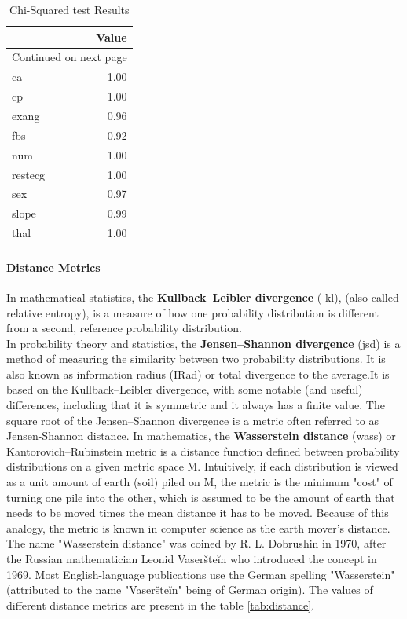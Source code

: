 \documentclass{article}
\begin{document}
\begin{longtable}{lr}
\caption{Chi-Squared test Results}\label{tab:cs}\\
\toprule
{} & Value \\
\midrule
\endhead
\midrule
\multicolumn{2}{r}{{Continued on next page}} \\
\midrule
\endfoot

\bottomrule
\endlastfoot
ca      &  1.00 \\
cp      &  1.00 \\
exang   &  0.96 \\
fbs     &  0.92 \\
num     &  1.00 \\
restecg &  1.00 \\
sex     &  0.97 \\
slope   &  0.99 \\
thal    &  1.00 \\
\end{longtable}



\paragraph{Distance Metrics}
In mathematical statistics, the \textbf{Kullback–Leibler divergence} ( \acrshort{kl}),  (also called relative entropy), is a measure of how one probability distribution is different from a second, reference probability distribution.\\
In probability theory and statistics, the \textbf{Jensen–Shannon divergence} (\acrshort{jsd}) is a method of measuring the similarity between two probability distributions. It is also known as information radius (IRad) or total divergence to the average.It is based on the Kullback–Leibler divergence, with some notable (and useful) differences, including that it is symmetric and it always has a finite value. The square root of the Jensen–Shannon divergence is a metric often referred to as Jensen-Shannon distance.     
In mathematics, the \textbf{Wasserstein distance} (\acrshort{wass}) or Kantorovich–Rubinstein metric is a distance function defined between probability distributions on a given metric space M.
Intuitively, if each distribution is viewed as a unit amount of earth (soil) piled on M, the metric is the minimum "cost" of turning one pile into the other, which is assumed to be the amount of earth that needs to be moved times the mean distance it has to be moved. Because of this analogy, the metric is known in computer science as the earth mover's distance.
The name "Wasserstein distance" was coined by R. L. Dobrushin in 1970, after the Russian mathematician Leonid Vaseršteĭn who introduced the concept in 1969. Most English-language publications use the German spelling "Wasserstein" (attributed to the name "Vaseršteĭn" being of German origin). The values of different distance metrics are present in the table \ref{tab:distance}.\\
\end{document}
